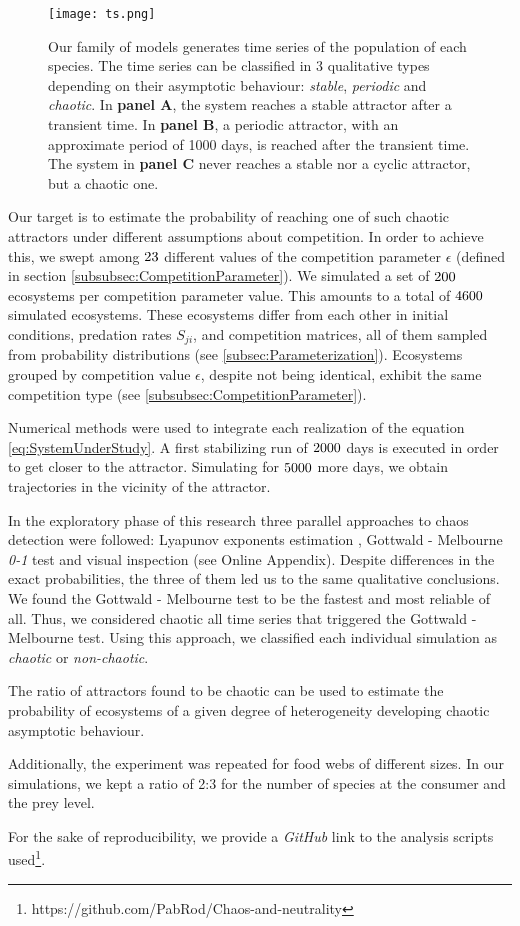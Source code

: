 \begin{figure}
	\begin{center}
		\texttt{[image: ts.png]}
	\end{center}
	\caption{Our family of models generates time series of the population of each species. The time series can be classified in $3$ qualitative types depending on their asymptotic behaviour: \textit{stable}, \textit{periodic} and \textit{chaotic}. In \textbf{panel A}, the system reaches a stable attractor after a transient time. In \textbf{panel B}, a periodic attractor, with an approximate period of 1000 days, is reached after the transient time. The system in \textbf{panel C} never reaches a stable nor a cyclic attractor, but a chaotic one.}
	\label{fig:TimeSeries}
\end{figure}

Our target is to estimate the probability of reaching one of such chaotic attractors under different assumptions about competition. In order to achieve this, we swept among $23$ different values of the competition parameter $\epsilon$ (defined in section \ref{subsubsec:CompetitionParameter}). We simulated a set of $200$ ecosystems per competition parameter value. This amounts to a total of $4600$ simulated ecosystems. These ecosystems differ from each other in initial conditions, predation rates $S_{ji}$, and competition matrices, all of them sampled from probability distributions (see \ref{subsec:Parameterization}). Ecosystems grouped by competition value $\epsilon$, despite not being identical, exhibit the same competition type (see \ref{subsubsec:CompetitionParameter}).

Numerical methods were used to integrate each realization of the equation \ref{eq:SystemUnderStudy}. A first stabilizing run of $ 2000 $ days is executed in order to get closer to the attractor. Simulating for $ 5000 $ more days, we obtain trajectories in the vicinity of the attractor.

In the exploratory phase of this research three parallel approaches to chaos detection were followed: Lyapunov exponents estimation \cite{Strogatz1994}, Gottwald - Melbourne \textit{0-1} test \cite{Gottwald2009} and visual inspection (see Online Appendix). Despite differences in the exact probabilities, the three of them led us to the same qualitative conclusions. We found the Gottwald - Melbourne test to be the fastest and most reliable of all. Thus, we considered chaotic all time series that triggered the Gottwald - Melbourne test. Using this approach, we classified each individual simulation as \textit{chaotic} or \textit{non-chaotic}.

The ratio of attractors found to be chaotic can be used to estimate the probability of ecosystems of a given degree of heterogeneity developing chaotic asymptotic behaviour.

Additionally, the experiment was repeated for food webs of different sizes. In our simulations, we kept a ratio of 2:3 for the number of species at the consumer and the prey level.

For the sake of reproducibility, we provide a \textit{GitHub} link to the analysis scripts used\footnote{https://github.com/PabRod/Chaos-and-neutrality}.